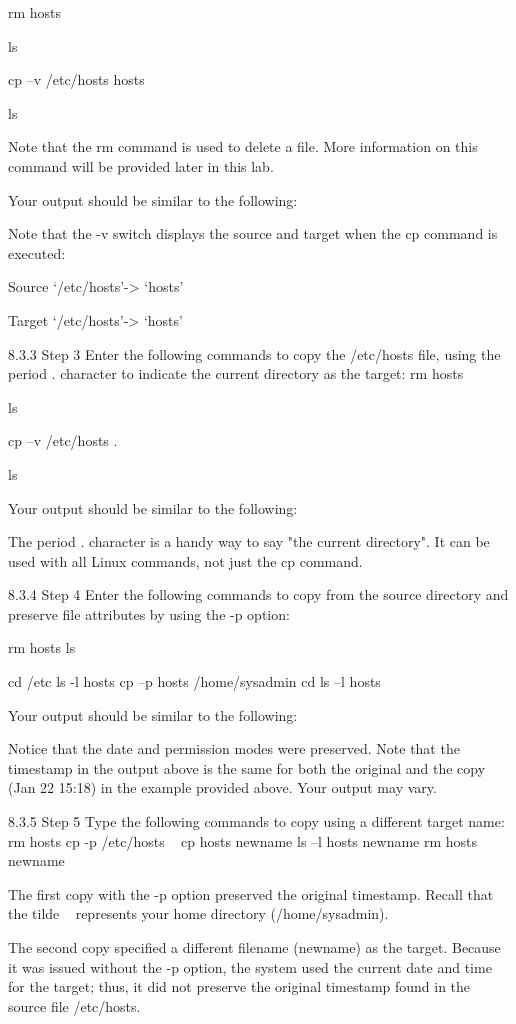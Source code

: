 rm hosts

ls

cp –v /etc/hosts hosts

ls

Note that the rm command is used to delete a file. More information on this command will be
provided later in this lab.

Your output should be similar to the following:



Note that the -v switch displays the source and target when the cp command is executed:

Source
`/etc/hosts'-> `hosts'

Target
`/etc/hosts'-> `hosts'

8.3.3 Step 3
Enter the following commands to copy the /etc/hosts file, using the period . character to
indicate the current directory as the target:
rm hosts

ls

cp –v /etc/hosts .

ls

Your output should be similar to the following:

The period . character is a handy way to say "the current directory". It can be used with all Linux
commands, not just the cp command.

8.3.4 Step 4
Enter the following commands to copy from the source directory and preserve file attributes by
using the -p option:

rm hosts
ls



cd /etc
ls -l hosts
cp –p hosts /home/sysadmin
cd
ls –l hosts

Your output should be similar to the following:

Notice that the date and permission modes were preserved. Note that the timestamp in the
output above is the same for both the original and the copy (Jan 22 15:18) in the example
provided above. Your output may vary.

8.3.5 Step 5
Type the following commands to copy using a different target name:
rm hosts
cp -p /etc/hosts ~
cp hosts newname
ls –l hosts newname
rm hosts newname

The first copy with the -p option preserved the original timestamp. Recall that the tilde ~
represents your home directory (/home/sysadmin).



The second copy specified a different filename (newname) as the target. Because it was
issued without the -p option, the system used the current date and time for the target; thus, it
did not preserve the original timestamp found in the source file /etc/hosts.

